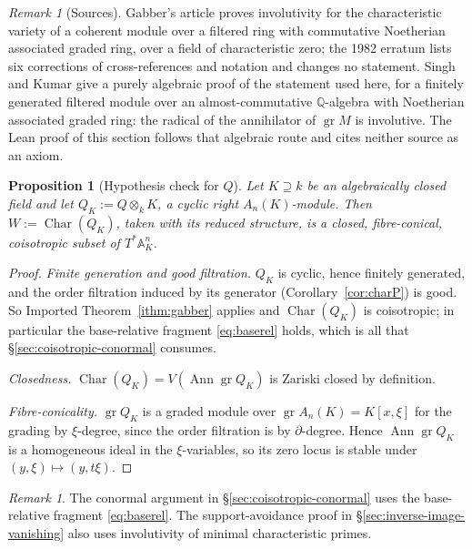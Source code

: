 \documentclass[11pt]{article}
\theoremstyle{plain}
\newtheorem{proposition}[theorem]{Proposition}
\theoremstyle{definition}
\theoremstyle{remark}
\newtheorem{remark}[theorem]{Remark}
\theoremstyle{plain}
\newcommand{\Char}{\operatorname{Char}}
\newcommand{\gr}{\operatorname{gr}}
\newcommand{\Ann}{\operatorname{Ann}}
\newcommand{\bbA}{\mathbb{A}}
\newcommand{\bbQ}{\mathbb{Q}}
\begin{document}
\begin{remark}[Sources]\label{rem:gabbersources}
Gabber's article proves involutivity for the characteristic variety of a
coherent module over a filtered ring with commutative Noetherian associated
graded ring, over a field of characteristic zero; the 1982 erratum
\cite{GabberErratum} lists six corrections of cross-references and notation
and changes no statement. Singh and Kumar \cite{SinghKumar} give a purely
algebraic proof of the statement used here, for a finitely generated filtered
module over an almost-commutative $\bbQ$-algebra with Noetherian associated
graded ring: the radical of the annihilator of $\gr M$ is involutive. The
Lean proof of this section follows that algebraic route and cites neither
source as an axiom.
\end{remark}

\begin{proposition}[Hypothesis check for $Q$]\label{prop:gabbercheck}
Let $K\supseteq k$ be an algebraically closed field and let
$Q_K:=Q\otimes_kK$, a cyclic right $A_n(K)$-module. Then $W:=\Char(Q_K)$, taken
with its reduced structure, is a closed, fibre-conical, coisotropic subset of
$T^*\bbA^n_K$.
\end{proposition}

\begin{proof}
\emph{Finite generation and good filtration.} $Q_K$ is cyclic, hence finitely
generated, and the order filtration induced by its generator
(Corollary~\ref{cor:charP}) is good. So Imported
Theorem~\ref{ithm:gabber} applies and $\Char(Q_K)$ is coisotropic; in
particular the base-relative fragment \eqref{eq:baserel} holds, which is all
that \S\ref{sec:coisotropic-conormal} consumes.

\emph{Closedness.} $\Char(Q_K)=V(\Ann\gr Q_K)$ is Zariski closed by definition.

\emph{Fibre-conicality.} $\gr Q_K$ is a graded module over
$\gr A_n(K)=K[x,\xi]$ for the grading by $\xi$-degree, since the order
filtration is by $\partial$-degree. Hence $\Ann\gr Q_K$ is a homogeneous ideal
in the $\xi$-variables, so its zero locus is stable under
$(y,\xi)\mapsto(y,t\xi)$.
\end{proof}

\begin{remark}\label{rem:onlyfragment}
The conormal argument in \S\ref{sec:coisotropic-conormal} uses the
base-relative fragment \eqref{eq:baserel}. The support-avoidance proof in
\S\ref{sec:inverse-image-vanishing} also uses involutivity of minimal
characteristic primes.
\end{remark}
\end{document}

